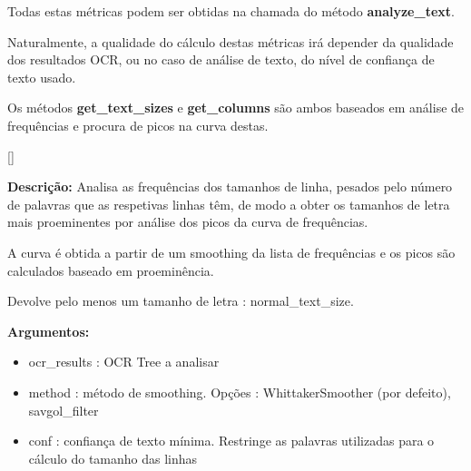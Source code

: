 Todas estas métricas podem ser obtidas na chamada do método \textbf{analyze\_text}.

Naturalmente, a qualidade do cálculo destas métricas irá depender da qualidade dos resultados OCR, ou no caso de análise de texto, do nível de confiança de texto usado.

Os métodos \textbf{get\_text\_sizes} e \textbf{get\_columns} são ambos baseados em análise de frequências e procura de picos na curva destas.


[\normalsize]

\textbf{Descrição:} Analisa as frequências dos tamanhos de linha, pesados pelo número de palavras que as respetivas linhas têm, de modo a obter os tamanhos de letra mais proeminentes por análise dos picos da curva de frequências.

A curva é obtida a partir de um smoothing da lista de frequências e os picos são calculados baseado em proeminência.

Devolve pelo menos um tamanho de letra : normal\_text\_size.

\textbf{Argumentos:}
\begin{itemize}\setlength\itemsep{-0.3em}
	\item ocr\_results : OCR Tree a analisar
	\item method : método de smoothing. Opções : WhittakerSmoother (por defeito), savgol\_filter
	\item conf : confiança de texto mínima. Restringe as palavras utilizadas para o cálculo do tamanho das linhas
\end{itemize}


